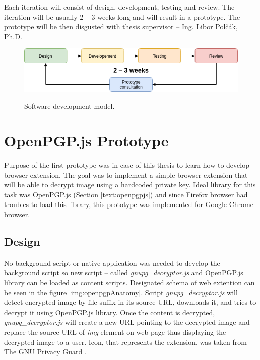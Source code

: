 Each iteration will consist of design, development, testing and review. The iteration will be usually 2 -- 3 weeks long and will result in a prototype. The prototype will be then disgusted with thesis supervisor -- Ing. Libor Polčák, Ph.D.

\begin{figure}[H]
    \begin{center}
        \label{img:extensionAnatomy}
        \includegraphics[width=1.0\textwidth]{obrazky-figures/developementModel.png}
        \caption{Software development model.}
    \end{center}
\end{figure}

\section{OpenPGP.js Prototype}
\label{prototype:OpenPGPjs}
Purpose of the first prototype was in case of this thesis to learn how to develop browser extension. The goal was to implement a simple browser extension that will be able to decrypt image using a hardcoded private key. Ideal library for this task was OpenPGP.js (Section \ref{text:openpgpjs}) and since Firefox browser had troubles to load this library, this prototype was implemented for Google Chrome browser.

\subsection{Design}
No background script or native application was needed to develop the background script so new script -- called \textit{gnupg\_decryptor.js} and OpenPGP.js library can be loaded as content scripts. Designated schema of web extention can be seen in the figure \ref{img:openpgpAnatomy}. Script \textit{gnupg\_decryptor.js} will detect encrypted image by file suffix in its source URL, downloads it, and tries to decrypt it using OpenPGP.js library. Once the content is decrypted, \textit{gnupg\_decryptor.js} will create a new URL pointing to the decrypted image and replace the source URL of \textit{img} element on web page thus displaying the decrypted image to a user. Icon, that represents the extension, was taken from The GNU Privacy Guard \cite{GnuPG}.

